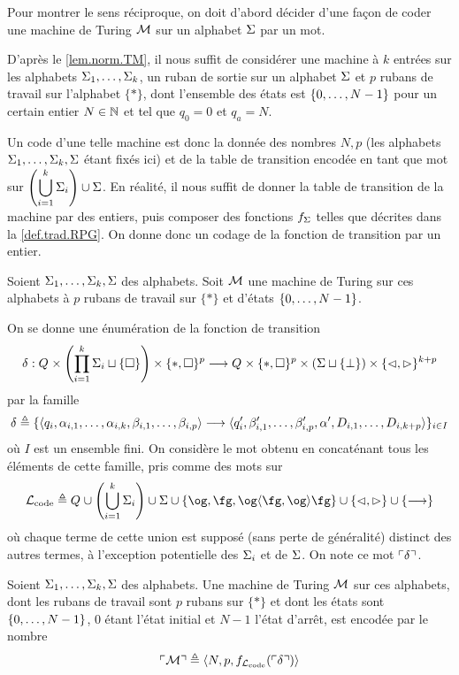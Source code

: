 Pour montrer le sens réciproque, on doit d'abord décider d'une façon de coder
une machine de Turing $\mathcal{M}$ sur un alphabet $\Sigma$ par un mot.

D'après le \cref{lem.norm.TM}, il nous suffit de considérer
une machine à $k$ entrées sur les alphabets $\Sigma_1,\ldots,\Sigma_k$, un ruban
de sortie sur un alphabet $\Sigma$ et $p$ rubans de travail sur l'alphabet
$\{*\}$, dont l'ensemble des états est $\{0,\ldots,N - 1\}$ pour un certain entier
$N\in \mathbb N$ et tel que $q_0 = 0$ et $q_a = N$.

Un code d'une telle machine est donc la donnée des nombres $N,p$ (les alphabets
$\Sigma_1,\ldots,\Sigma_k,\Sigma$ étant fixés ici) et de la table de transition
encodée en tant que mot sur
$\displaystyle\left(\bigcup_{i = 1}^k \Sigma_i\right)\cup \Sigma$. En réalité,
il nous suffit de donner la table de transition de la machine par des entiers,
puis composer des fonctions $f_\Sigma$ telles que décrites dans la
\cref{def.trad.RPG}. On donne donc un codage de la fonction de transition par un
entier.

\begin{definition}
  Soient $\Sigma_1,\ldots,\Sigma_k, \Sigma$ des alphabets. Soit $\mathcal{M}$ une machine
  de Turing sur ces alphabets à $p$ rubans de travail sur $\{*\}$ et d'états
  $\{0,\ldots,N - 1\}$.

  On se donne une énumération de la fonction de
  transition
  \[\delta_{} : \displaystyle Q_{}\times\left(\prod_{i = 1}^k\Sigma_i
                  \sqcup\{\square\}\right)\times\{*,\square\}^p \longrightarrow Q_{}\times\{*,\square\}^p\times
                  (\Sigma\sqcup\{\bot\})\times\{\lhd,\rhd\}^{k+p}\]
  par la famille
  \[\delta_{} \triangleq \{\langle q_{i},\alpha_{i,1},\ldots,\alpha_{i,k},
  \beta_{i,1},\ldots,\beta_{i,p}\rangle
  \longrightarrow \langle q_{i}', \beta'_{i,1},\ldots,\beta'_{i,p},\alpha',
  D_{i,1},\ldots,D_{i,k+p}\rangle \}_{i \in I} \]
  où $I$ est un ensemble fini. On considère le mot obtenu en concaténant tous
  les éléments de cette famille, pris comme des mots sur
  \[\varLL_{\rmCode} \defeq
  \varQQ \cup \left(\bigcup_{i = 1}^k \ABA_i\right) \cup \ABA \cup
  \{\ogM,\fgM, \ogM\langle\fgM,\ogM\rangle\fgM\} \cup
  \{\lhd,\rhd\}\cup \{\longrightarrow\}\]
  où chaque terme de cette union est supposé (sans perte de généralité)
  distinct des autres termes, à l'exception potentielle des $\Sigma_i$ et de
  $\Sigma$. On note ce mot $\ulcorner\delta_{}\urcorner$.
\end{definition}

\begin{definition}
  Soient $\Sigma_1,\ldots,\Sigma_k,\Sigma$ des alphabets. Une machine de Turing
  $\mathcal{M}$ sur ces alphabets, dont les rubans de travail sont $p$ rubans sur
  $\{*\}$ et dont les états sont $\{0,\ldots,N - 1\}$, $0$ étant l'état initial et
  $N-1$ l'état d'arrêt, est encodée par le nombre
  \[\ulcorner\mathcal{M}\urcorner \triangleq \langle N,p,
  f_{\mathcal L_{\operatorname{code}}}(\ulcorner\delta_{}\urcorner)\rangle\]
  \index[notation]{$\godcod{\varTMM}$}
\end{definition}

